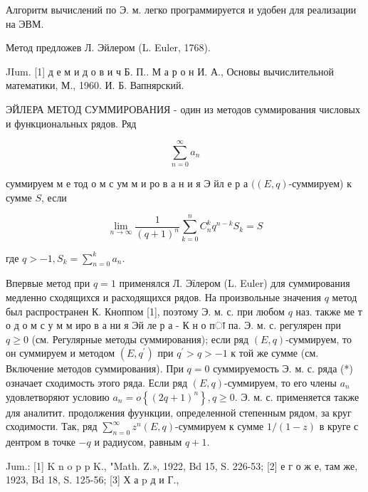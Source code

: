 \documentclass[10pt]{article}
\begin{document}
Алгоритм вычислений по Э. м. легко программируется и удобен для реализации на ЭВМ.



Метод предложев Л. Эйлером (L. Euler, 1768).



JIum. [1] д е м и д о в и ч Б. П.. М а р о н И. А., Основы вычислительной математики, М., 1960. И. Б. Вапнярский.



ЭЙЛЕРА МЕТОД СУММИРОВАНИЯ - один из методов суммирования числовых и функциональных рядов. Ряд



\[

\sum_{n=0}^{\infty} a_{n}

\]



суммируем м е тод о м с ум м и ро в а н и я Э йл е р а $((E, q)$-суммируем) к сумме $S$, если



\[

\lim _{n \rightarrow \infty} \frac{1}{(q+1)^{n}} \sum_{k=0}^{n} C_{n}^{k} q^{n-k} S_{k}=S

\]



где $q>-1, S_{k}=\sum_{n=0}^{k} a_{n}$.



Впервые метод при $q=1$ применялся Л. Эїлером (L. Euler) для суммирования медленно сходящихся и расходящихся рядов. На произвольные значения $q$ метод был распространен К. Кноппом [1], поэтому Э. м. с. при любом $q$ наз. также ме т о д о м с у м м иро в а ни я Эй ле р а - К н о пा па. Э. м. с. регулярен при $q \geqslant 0$ (см. Регулярные методы суммирования); если ряд $(E, q)$-суммируем, то он суммируем и методом $\left(E, q^{\prime}\right)$ при $q^{\prime}>q>-1$ к той же сумме (см. Включение методов суммирования). При $q=0$ суммируемость Э. м. с. ряда (*) означает сходимость этого ряда. Если ряд $(E, q)$-суммируем, то его члены $a_{n}$ удовлетворяют условию $a_{n}=o\left\{(2 q+1)^{n}\right\}, q \geqslant 0$. Э. м. с. применяется также для аналитит. продолжения фуункции, определенной степенным рядом, за круг сходимости. Так, ряд $\sum_{n=0}^{\infty} z^{n}(E, q)$-суммируем к сумме $1 /(1-z)$ в круге с дентром в точке $-q$ и радиусом, равным $q+1$.



Jum.: [1] K n o p p K., "Math. Z.», 1922, Bd 15, S. 226-53; [2] е г о ж е, там же, 1923, Bd 18, S. 125-56; [3] Х а p д и Г.,
\end{document}
